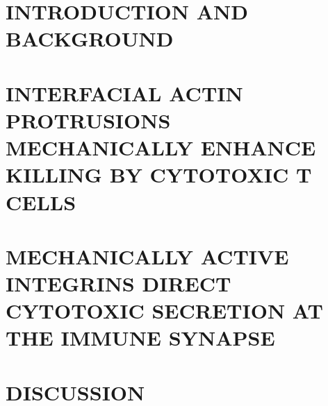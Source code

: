 \documentclass[phd,tocprelim]{cornell}
\begin{document}
\pagestyle{cornell} \addtolength{\parskip}{0.5\baselineskip}

\chapter{INTRODUCTION AND BACKGROUND}
\label{chap:introduction}
\normalspacing \setcounter{page}{1} 


\chapter{INTERFACIAL ACTIN PROTRUSIONS MECHANICALLY ENHANCE KILLING BY CYTOTOXIC T CELLS}
\label{chap:chapter2}


\chapter{MECHANICALLY ACTIVE INTEGRINS DIRECT CYTOTOXIC SECRETION AT THE IMMUNE SYNAPSE}
\label{chap:chapter3}


\chapter{DISCUSSION}
\label{chap:discussion}


%


\end{document}
